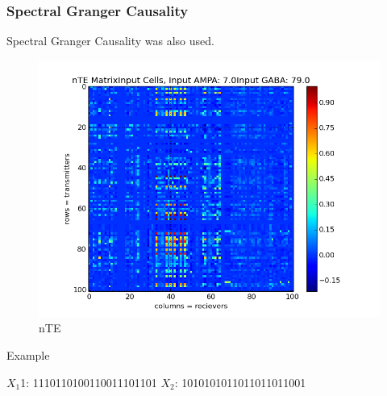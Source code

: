 \documentclass{beamer}
\begin{document}
\begin{frame}
\frametitle{Spectral Granger Causality}
Spectral Granger Causality was also used.

\begin{figure}
\begin{minipage}{0.45\linewidth}
\centering
\includegraphics[scale=0.4]{nTE_matrix_imshow0_0500_0125010_010012_010_0.png}
\caption{nTE}

\end{minipage}
\begin{minipage}{0.45\linewidth}

\end{minipage}
\end{figure}

\end{frame}


\begin{frame}
Example

$X_{1}$1: 1110110100110011101101
$X_{2}$: 1010101011011011011001


\end{frame}
\end{document}
